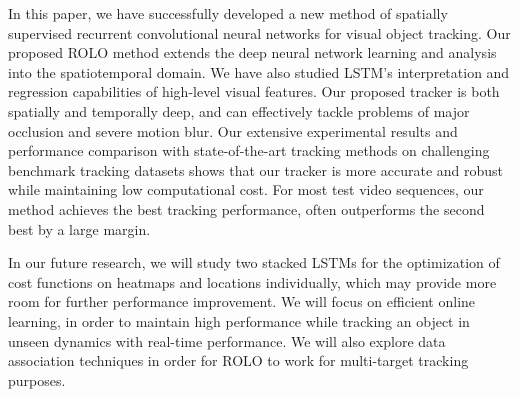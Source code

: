 \documentclass{article}
\begin{document}
In this paper, we have successfully developed a new method of spatially supervised recurrent convolutional neural networks for visual object tracking.  Our proposed ROLO method extends the deep neural network learning and analysis into the spatiotemporal domain. 
We have also studied LSTM's interpretation and regression capabilities of high-level visual features. Our proposed tracker is both spatially and temporally deep, and can effectively tackle problems of major occlusion and severe motion blur.
Our extensive experimental results and performance comparison with state-of-the-art tracking methods on challenging benchmark tracking datasets shows that our tracker is more accurate and robust while maintaining low computational cost. For most test video sequences, our method achieves the best tracking performance, often outperforms the second best by a large margin. 

In  our future research, we will study two stacked LSTMs for the optimization of cost functions on heatmaps and locations individually, which may provide more room for further performance improvement. %
We will focus on efficient online learning, in order to maintain high performance while tracking an object in unseen dynamics with real-time performance. We will also explore data association techniques in order for ROLO to work for multi-target tracking purposes.

%

\small

\end{document}
